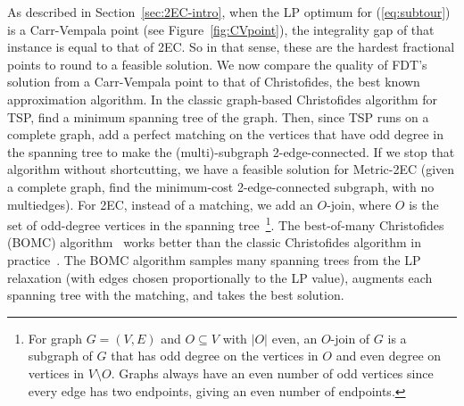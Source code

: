 As described in Section~\ref{sec:2EC-intro}, when the LP optimum for (\ref{eq:subtour}) is a Carr-Vempala point (see Figure~\ref{fig:CVpoint}), the integrality gap of that instance is equal to that of 2EC. So in that sense, these are the hardest fractional points to round to a feasible solution. We now compare the quality of FDT's solution from a Carr-Vempala point to that of Christofides, the best known approximation algorithm.  In the classic graph-based Christofides algorithm for TSP, find a minimum spanning tree of the graph.  Then, since TSP runs on a complete graph, add a perfect matching on the vertices that have odd degree in the spanning tree to make the (multi)-subgraph 2-edge-connected. If we stop that algorithm without shortcutting, we have a feasible solution for Metric-2EC (given a complete graph, find the minimum-cost 2-edge-connected subgraph, with no multiedges).
For 2EC, instead of a matching, we add an $O$-join, where $O$ is the set of odd-degree vertices in the spanning tree~\footnote{For graph $G=(V,E)$ and $O\subseteq V$ with $|O|$ even, an $O$-join of $G$ is a subgraph of $G$ that has odd degree on the vertices in $O$ and even degree on vertices in $V\setminus O$. Graphs always have an even number of odd vertices since every edge has two endpoints, giving an even number of endpoints.}. The best-of-many Christofides (BOMC) algorithm~\cite{AKS15} works better than the classic Christofides algorithm in practice~\cite{GW17}.  The BOMC algorithm samples many spanning trees from the LP relaxation (with edges chosen proportionally to the LP value), augments each spanning tree with the matching, and takes the best solution.


